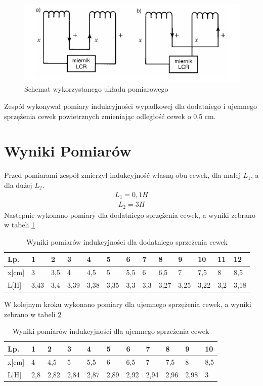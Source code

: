 \documentclass{article}
\begin{document}
\begin{figure}[h!]
    \centering
    \includegraphics[scale=0.6]{cw44/układ.png}
    \caption{Schemat wykorzystanego układu pomiarowego}
\end{figure}
 Zespół wykonywał pomiary indukcyjności wypadkowej dla dodatniego i ujemnego sprzężenia cewek powietrznych zmieniając odległość cewek o 0,5 cm. 
 \section{Wyniki Pomiarów}
 Przed pomiarami zespół zmierzył indukcyjność własną obu cewek, dla małej $L_{1}$, a dla dużej $L_{2}$.\newline
 \begin{align*}
   L_1= 0,1 \si{H}
\end{align*}
\begin{align*}
    L_2= 3 \si{H}
\end{align*}
Następnie wykonano pomiary dla dodatniego sprzężenia cewek, a wyniki zebrano w tabeli \ref{tabe:1}
\begin{table}[!ht]
    \centering
    \begin{tabular}{|l|l|l|l|l|l|l|l|l|l|l|l|l|}
    \hline
        Lp. & 1 & 2 & 3 & 4 & 5 & 6 & 7 & 8 & 9 & 10 & 11 & 12 \\ \hline
        x[cm] & 3 & 3,5 & 4 & 4,5 & 5 & 5,5 & 6 & 6,5 & 7 & 7,5 & 8 & 8,5 \\ \hline
        L[H] & 3,43 & 3,4 & 3,39 & 3,38 & 3,35 & 3,3 & 3,3 & 3,27 & 3,25 & 3,22 & 3,2 & 3,18 \\ \hline
    \end{tabular}
    \caption{Wyniki pomiarów indukcyjności dla dodatniego sprzeżenia cewek}
    \label{tabe:1}
\end{table}

W kolejnym kroku wykonano pomiary dla ujemnego sprzężenia cewek, a wyniki zebrano w tabeli \ref{tabe:2}
\begin{table}[!ht]
    \centering
    \begin{tabular}{|l|l|l|l|l|l|l|l|l|l|l|}
    \hline
        Lp. & 1 & 2 & 3 & 4 & 5 & 6 & 7 & 8 & 9 & 10 \\ \hline
        x[cm] & 4 & 4,5 & 5 & 5,5 & 6 & 6,5 & 7 & 7,5 & 8 & 8,5 \\ \hline
        L[H] & 2,8 & 2,82 & 2,84 & 2,87 & 2,89 & 2,92 & 2,94 & 2,96 & 2,98 & 3 \\ \hline
    \end{tabular}
    \caption{Wyniki pomiarów indukcyjności dla ujemnego sprzeżenia cewek}
    \label{tabe:2}
\end{table}
\end{document}
